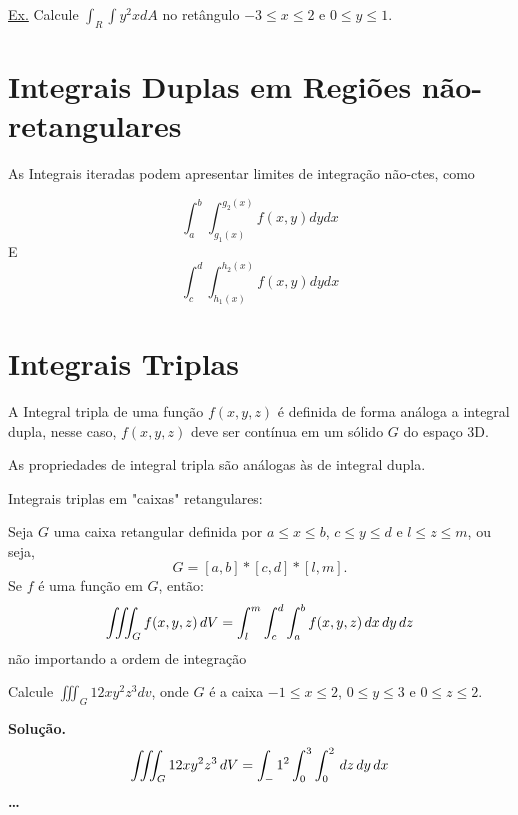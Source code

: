 \documentclass[portugues, 11pt]{article}
\begin{document}
	\underline{Ex.} Calcule $\int_R\int{y^2x}dA$ no retângulo $-3\leq x\leq 2$ e $0 \leq y \leq 1$.
	
	
	\section{Integrais Duplas em Regiões não-retangulares}
	As Integrais iteradas podem apresentar limites de integração não-ctes, como
	
	\begin{equation}
		\int_a^b\int_{g_{1}(x)}^{g_{2}(x)}{f(x,y) dydx}
	\end{equation}
	E
	\begin{equation}
		\int_c^d\int_{h_{1}(x)}^{h_{2}(x)}{f(x,y) dydx}
	\end{equation}
	
	
	\section{Integrais Triplas}
	A Integral tripla de uma função $f(x,y,z)$ é definida de forma análoga a integral dupla, nesse caso, $f(x,y,z)$ deve ser contínua em um sólido $G$ do espaço 3D.

	As propriedades de integral tripla são análogas às de integral dupla.

	Integrais triplas em "caixas" retangulares:

	\begin{thrm}
		Seja $G$ uma caixa retangular definida por $a\leq x \leq b$, $c \leq y \leq d$ e $l \leq z \leq m$, ou seja, 
		\begin{equation}
			G = [a,b]*[c,d]*[l,m].
		\end{equation}
		Se $f$ é uma função em $G$, então:
		\begin{equation}
			\iiint_G f(x,y,z) \,dV  \\
			= \int_l^m\int_c^d\int_a^b f(x,y,z) \,dx\,dy\,dz
		\end{equation}
		não importando a ordem de integração
	\end{thrm}

	\begin{exmp}
		Calcule $ \iiint_G {12xy^2z^3}{dv}$, onde $G$ é a caixa $-1 \leq x \leq 2$, $0 \leq y \leq 3$ e $0 \leq z \leq 2$.
		
		\textbf{Solução.}
		\begin{equation}
			\iiint_G 12xy^2z^3 \,dV \\
			= \int_-1^2\int_0^3\int_0^2 \,dz\,dy\,dx
		\end{equation}
		\textbf{\dots}

	\end{exmp}
	
\end{document}

